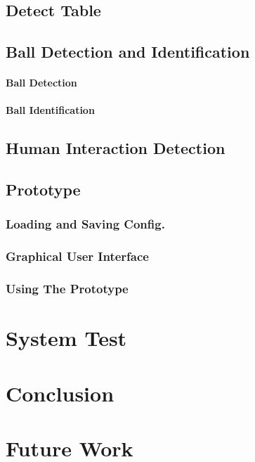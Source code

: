 	\section{Detect Table}
		\label{sec:table-locate}
			
		

	\section{Ball Detection and Identification}
		\label{sec:balls-intro}	
			
		
			\subsubsection{Ball Detection}
				\label{sec:balls-locate}
				
		
			\subsubsection{Ball Identification}
				\label{sec:balls-id}
				
				
	\section{Human Interaction Detection}
		\label{sec:shotdetection}
		
				
	\section{Prototype}
		
		
		\subsection{Loading and Saving Config.}
			\label{sec:loadsaveconfig}
					
		
		\subsection{Graphical User Interface}
			\label{sec:gui}	
			
			
		\subsection{Using The Prototype}
			\label{sec:using prototype}
			
		
\chapter{System Test}
	\label{sec:system-test}
	
	
\chapter{Conclusion}
	\label{sec:conclusion}
	
	
\chapter{Future Work}
	\label{sec:futurework}
	



\listoffixmes


